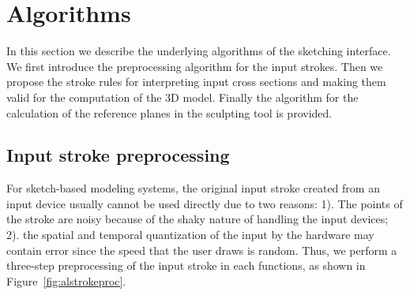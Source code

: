 \section{Algorithms}
\label{ch3:sec:algo}

In this section we describe the underlying algorithms of the
sketching interface. We first introduce the preprocessing algorithm
for the input strokes. Then we propose the stroke rules for
interpreting input cross sections and making them valid for the
computation of the 3D model. Finally the  algorithm for the
calculation of the reference planes in the sculpting tool is
provided.

\subsection{Input stroke preprocessing}\label{ch3:sec:alg:strokepreproc}

For sketch-based modeling systems, the original input stroke created
from an input device usually cannot be used directly due to two
reasons: 1). The points of the stroke are noisy because of the shaky
nature of handling the input devices; 2). the spatial and temporal
quantization of the input by the hardware may contain error since
the speed that the user draws is random. Thus, we perform a
three-step preprocessing of the input stroke in each functions, as
shown in Figure~\ref{fig:alstrokeproc}.

